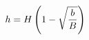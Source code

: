 \documentclass[preview]{standalone}
\begin{document}
\begin{align*}
\special{dvisvgm:raw <g id='unique000'>}h=H\left(1-\sqrt{\frac{b}{B}}\right)\special{dvisvgm:raw </g>}
\end{align*}
\end{document}
